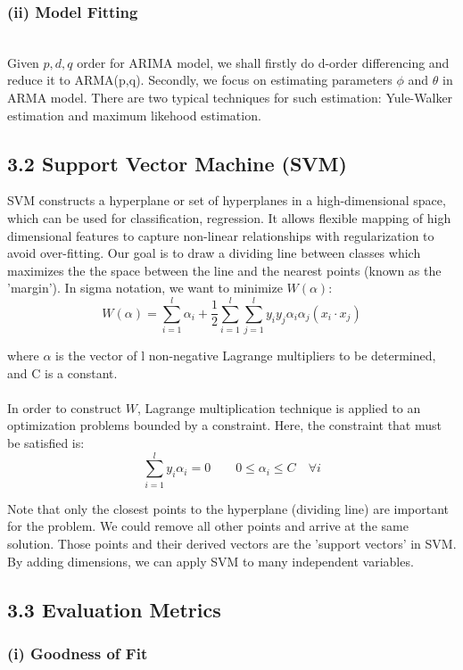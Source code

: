 \documentclass[letterpaper]{article} %
\begin{document}
\subsubsection*{(ii) Model Fitting}~\\
Given $p,d,q$ order for ARIMA model, we shall firstly do d-order differencing and reduce it to ARMA(p,q). Secondly, we focus on estimating parameters $\phi$ and $\theta$ in ARMA model. There are two typical techniques for such estimation: Yule-Walker estimation and maximum likehood estimation.

\subsection*{3.2 Support Vector Machine (SVM)}

SVM constructs a hyperplane or set of hyperplanes in a high-dimensional space, which can be used for classification, regression. It allows flexible mapping of high dimensional features to capture non-linear relationships with regularization to avoid over-fitting. Our goal is to draw a dividing line between classes which maximizes the the space between the line and the nearest points (known as the 'margin'). In sigma notation, we want to minimize $W(\alpha)$:
$$ W(\alpha) = \sum_{i=1}^l \alpha_i +
    \frac{1}{2} \sum_{i=1}^l \sum_{j=1}^l y_i y_j \alpha_i \alpha_j (x_i \cdot  x_j) $$

\noindent
where $\alpha$ is the vector of l non-negative Lagrange multipliers to be determined, and C is a constant. \\ \\ In order to construct $W$, Lagrange multiplication technique is applied to an optimization problems bounded by a constraint. Here, the constraint that must be satisfied is:
$$ \sum_{i=1}^l y_i \alpha_i = 0 \qquad 0 \le \alpha_i \le C \quad \forall i$$

\noindent
Note that only the closest points to the hyperplane (dividing line) are important for the problem. We could remove all other points and arrive at the same solution. Those points and their derived vectors are the 'support vectors' in SVM. By adding dimensions, we can apply SVM to many independent variables.


\subsection*{3.3 Evaluation Metrics}

\subsubsection*{(i) Goodness of Fit}~\\
\end{document}
